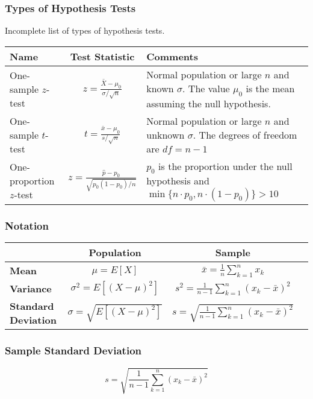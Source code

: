 \documentclass{beamer}
\begin{document}
\begin{frame}
\frametitle{Types of Hypothesis Tests}
\small
Incomplete list of types of hypothesis tests.

\begin{tabular}{p{1.3in} c p{2in}}
\hline
Name				&	Test Statistic							&	Comments \\\hline
One-sample $z$-test		&	$z = \frac{\bar{X} - \mu_0}{\sigma/\sqrt{n}}$	&	\tiny Normal population or large $n$ and known $\sigma$. The value $\mu_0$ is the mean assuming the null hypothesis. \\
One-sample $t$-test		&	$t = \frac{\bar{x} - \mu_0}{s/\sqrt{n}}$			&	\tiny Normal population or large $n$ and unknown $\sigma$. The degrees of freedom are $df = n - 1$\\
One-proportion $z$-test	&	$z = \frac{\hat{p} - p_0}{\sqrt{p_0(1 - p_0)/n}}$& \tiny	$p_0$ is the proportion under the null hypothesis and $\min\{ n\cdot p_0, n\cdot (1- p_0)\} > 10$\\
\end{tabular}
\end{frame}

\begin{frame}
\frametitle{Notation}

\begin{tabular}{l | c c c}
					&	{\bf Population}					&	{\bf Sample}\\\hline
{\bf Mean}				&	$\mu = E[X]$					&	$\bar{x} = \displaystyle\frac{1}{n}\sum_{k = 1}^n x_k$\\
{\bf Variance}			&	$\sigma^2 = E[(X - \mu)^2]$		&	$s^2 = \displaystyle\frac{1}{n - 1}\sum_{k = 1}^n (x_k - \bar{x})^2$\\
{\bf Standard Deviation}	&	$\sigma = \sqrt{E[(X - \mu)^2]}$		&	$s = \sqrt{ \displaystyle\frac{1}{n - 1}\sum_{k = 1}^n (x_k - \bar{x})^2}$\\
\end{tabular}

\end{frame}

\begin{frame}
\frametitle{Sample Standard Deviation}

$$s = \sqrt{\frac{1}{n - 1}\sum_{k = 1}^n (x_k - \bar{x})^2}$$

\end{frame}
\end{document}

